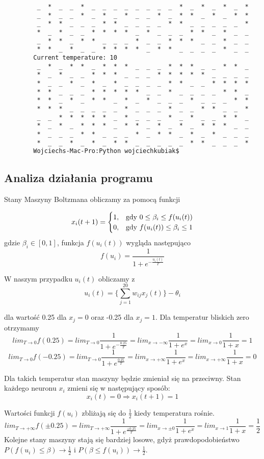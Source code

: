 \documentclass[11pt]{article}
\begin{document}
\begin{lstlisting}
         _  *  _  _  *  _  _  _  _  _  _  _  _  *  _  *  _  *  _  *  
         _  *  _  _  *  _  *  _  *  _  _  *  _  *  *  _  *  _  *  *  
         _  *  *  _  _  _  *  *  _  _  _  _  *  *  _  _  _  _  _  *  
         *  _  *  _  _  *  *  *  *  _  *  _  _  _  *  *  _  *  _  _  
         _  *  *  _  *  *  _  _  _  *  _  _  *  *  *  _  _  *  _  _  
         *  *  _  *  _  _  *  *  *  *  _  *  *  _  _  _  _  *  _  _  
        Current temperature: 10
         _  *  _  *  *  _  *  *  *  _  _  _  *  *  *  _  _  *  *  _  
         *  _  *  _  _  *  *  *  _  _  _  *  *  *  *  *  _  _  _  _  
         *  _  _  *  _  *  _  *  _  _  _  _  *  *  _  _  *  *  *  *  
         *  *  _  _  _  *  *  *  *  *  _  _  *  _  _  _  _  *  *  _  
         *  *  _  *  _  *  *  _  *  _  *  _  _  _  *  _  _  _  *  *  
         *  *  *  _  _  _  _  _  *  _  _  _  *  _  _  *  *  _  _  *  
         _  _  *  *  *  *  *  _  *  _  _  _  *  _  *  _  _  *  *  _  
         *  _  *  _  *  *  *  _  *  *  _  *  _  *  _  *  *  *  _  _  
         *  _  _  _  *  *  _  _  _  *  _  *  *  _  *  _  *  _  _  _  
         *  _  _  *  _  *  _  *  *  _  _  _  _  _  *  *  _  _  _  *  
        Wojciechs-Mac-Pro:Python wojciechkubiak$ 
    \end{lstlisting}
\subsection{Analiza działania programu}
Stany Maszyny Boltzmana obliczamy za pomocą funkcji

\[
    x_i(t+1) = 
    \begin{cases}
        1, & \text{gdy $0 \leq \beta_i \leq f(u_i(t))$} \\
        0, & \text{gdy $ f(u_i(t)) \leq \beta_i \leq 1$}
    \end{cases}
\]
gdzie $\beta_i \in [0, 1]$, funkcja $f(u_i(t))$ wygląda następująco
\[f(u_i) = \frac{1}{1 + e^{-\frac{u_i(t)}{T}}}\]

W naszym przypadku $u_i(t)$ obliczamy z
\[u_i(t) = \bigg\{ \sum^{20}_{j=1}w_{ij}x_j(t) \bigg\} - \theta_i\]

dla wartość 0.25 dla $x_j = 0$ oraz -0.25 dla $x_j = 1$.
Dla temperatur bliskich zero otrzymamy
\[lim_{T \rightarrow 0}f(0.25) = lim_{T \rightarrow 0}\frac{1}{1 + e^{-\frac{0.25}{T}}} = lim_{x \rightarrow - \infty}\frac{1}{1 + e^x} = lim_{x \rightarrow 0} \frac{1}{1 + x} = 1\]
\[lim_{T \rightarrow 0}f(-0.25) = lim_{T \rightarrow 0}\frac{1}{1 + e^{\frac{0.25}{T}}} = lim_{x \rightarrow + \infty}\frac{1}{1 + e^x} = lim_{x \rightarrow + \infty} \frac{1}{1 + x} = 0\]

Dla takich temperatur stan maszyny będzie zmieniał się na przeciwny. Stan każdego neuronu $x_i$ zmieni się w następujący sposób:
\[x_i(t) = 0 \Longrightarrow x_i(t+1) = 1\]

Wartości funkcji $f(u_i)$ zbliżają się do $\frac{1}{2}$ kiedy temperatura rośnie.
\[lim_{T \rightarrow + \infty}f(\pm 0.25) = lim_{T \rightarrow + \infty}\frac{1}{1 + e^{\frac{\pm 0.25}{T}}} = lim_{x \rightarrow \pm 0}\frac{1}{1+e^x} = lim_{x \rightarrow 1}\frac{1}{1 + x} = \frac{1}{2}\]
Kolejne stany maszyny stają się bardziej losowe, gdyż prawdopodobieństwo $P(f(u_i) \leq \beta) \rightarrow \frac{1}{2}$ i $P(\beta \leq f(u_i)) \rightarrow \frac{1}{2}$.
\end{document}
